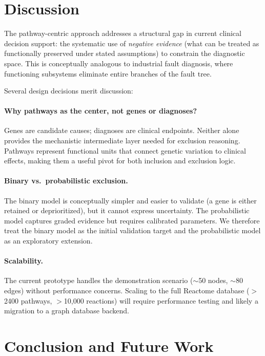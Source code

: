 \documentclass[12pt,a4paper]{article}
\begin{document}
\section{Discussion}
\label{sec:discussion}

The pathway-centric approach addresses a structural gap in current clinical decision support: the systematic use of \emph{negative evidence} (what can be treated as functionally preserved under stated assumptions) to constrain the diagnostic space. This is conceptually analogous to industrial fault diagnosis, where functioning subsystems eliminate entire branches of the fault tree.

Several design decisions merit discussion:

\paragraph{Why pathways as the center, not genes or diagnoses?} Genes are candidate causes; diagnoses are clinical endpoints. Neither alone provides the mechanistic intermediate layer needed for exclusion reasoning. Pathways represent functional units that connect genetic variation to clinical effects, making them a useful pivot for both inclusion and exclusion logic.

\paragraph{Binary vs.\ probabilistic exclusion.} The binary model is conceptually simpler and easier to validate (a gene is either retained or deprioritized), but it cannot express uncertainty. The probabilistic model captures graded evidence but requires calibrated parameters. We therefore treat the binary model as the initial validation target and the probabilistic model as an exploratory extension.

\paragraph{Scalability.} The current prototype handles the demonstration scenario ($\sim$50 nodes, $\sim$80 edges) without performance concerns. Scaling to the full Reactome database ($>$2400 pathways, $>$10{,}000 reactions) will require performance testing and likely a migration to a graph database backend.

\section{Conclusion and Future Work}
\label{sec:conclusion}
\end{document}
